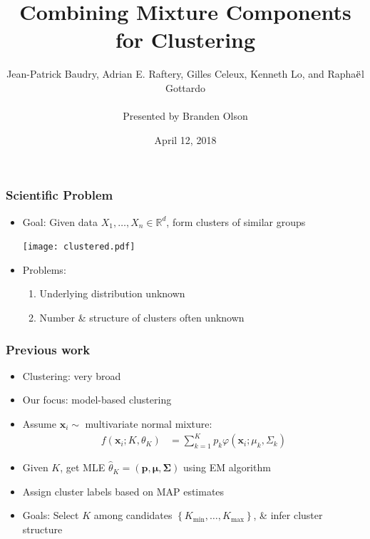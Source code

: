 \documentclass[mathserif,compress]{beamer}
\title[]{Combining Mixture Components for Clustering}
\author[]
{Jean-Patrick Baudry, Adrian E. Raftery, Gilles Celeux, Kenneth Lo, and Rapha$\ddot{\text e}$l Gottardo\\$\;$ \\Presented by Branden Olson}
\date[April, 2018]
{April 12, 2018}
\institute[]
{
}
\newcommand*\reals{\mathbb{R}}
\newcommand*\ba{\[ \begin{aligned}}
\newcommand*\ea{\end{aligned} \]}
\newcommand*\set[1]{\left\{#1\right\}}
\newcommand*\estim[1]{\widehat{#1}}
\renewcommand\;{\,}
\renewcommand\phi{\varphi}
\newcommand{\bx}{\mathbf{x}}
\begin{document}
\begin{frame}[noframenumbering]
  \titlepage
\end{frame}

\begin{frame}\frametitle{Scientific Problem}
\begin{itemize}
\item
Goal: Given data $X_1, \dotsc, X_n \in \reals^d$, form \alert{clusters} of similar groups
\begin{center}
\texttt{[image: clustered.pdf]}
\end{center}
\item
Problems:
\medskip
\begin{enumerate}
\item
Underlying distribution unknown
\medskip
\item
Number \& structure of clusters often unknown
\end{enumerate}
\end{itemize}
\end{frame}

\begin{frame}\frametitle{Previous work}
\begin{itemize}
\item
Clustering: very broad 
\medskip
\item
Our focus: model-based clustering
\medskip
\item
Assume $\bx_i \sim$ \alert{multivariate normal mixture}:
\ba
f(\bx_i ; K, \theta_K) 
	& = \sum_{k=1}^K p_k
		\phi \left(\bx_i ; \mu_k, \Sigma_k\right)
\ea
\smallskip
\item
Given $K$, get MLE 
$\estim\theta_K = (\mathbf p, \pmb\mu, \pmb\Sigma)$ using EM algorithm
\medskip
\item
Assign cluster labels based on MAP estimates
\medskip
\item
Goals: \alert{Select $K$} among candidates $\set{K_\text{min}, \dotsc, K_\text{max}}$,  \& \alert{infer cluster structure}
\medskip
\end{itemize}
\end{frame}
\end{document}

